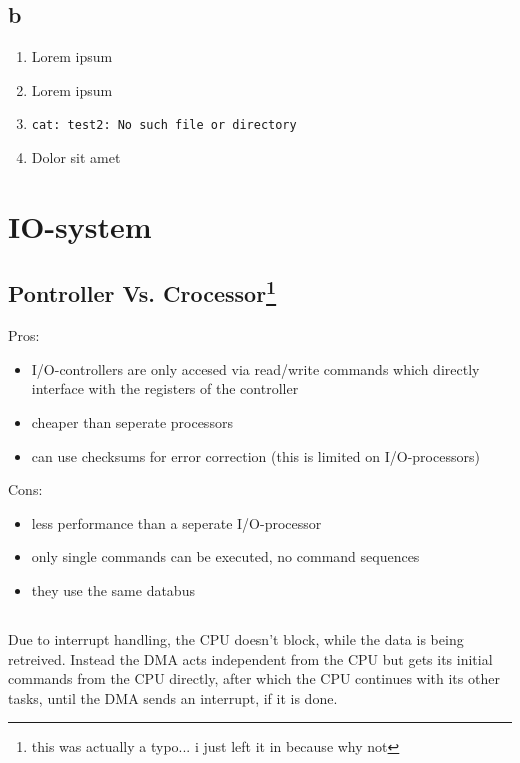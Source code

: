 \documentclass[a4paper, 11pt]{article}
\begin{document}
        \subsection{b}
        \begin{enumerate}
            \item[1.] Lorem ipsum
            \item[2.] Lorem ipsum
            \item[3.] \texttt{cat: test2: No such file or directory}
            \item[4.] Dolor sit amet
        \end{enumerate}
        \section{IO-system}
        \subsection[Pontroller Vs. Crocessor]{Pontroller Vs. Crocessor\footnote{this was actually a typo... i just left it in because why not}}
        Pros: \\
        \begin{itemize}
            \item I/O-controllers are only accesed via read/write commands which directly interface with the registers of the controller
            \item cheaper than seperate processors
            \item can use checksums for error correction (this is limited on I/O-processors)
        \end{itemize}
        Cons: \\
        \begin{itemize}
            \item less performance than a seperate I/O-processor
            \item only single commands can be executed, no command sequences
            \item they use the same databus 
        \end{itemize}
        \subsection{}
        Due to interrupt handling, the CPU doesn't block, while the data is being retreived. Instead the DMA acts 
        independent from the CPU but gets its initial commands from the CPU directly, after which the CPU continues with its other tasks, until the DMA sends an interrupt, if it is done.
        \newpage
\end{document}

